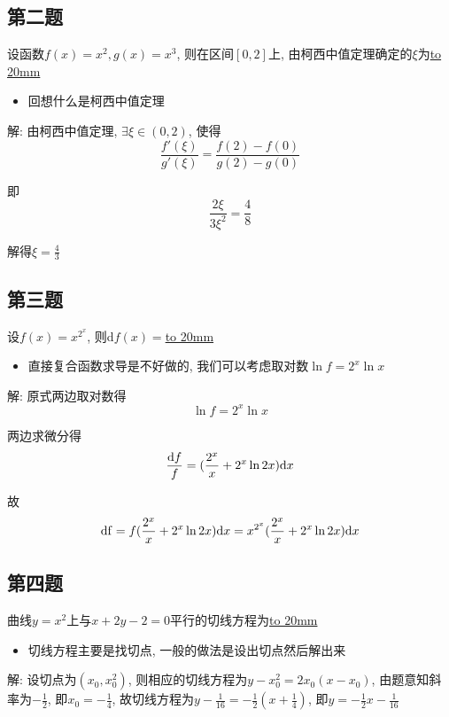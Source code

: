 \documentclass[10pt]{SelfArx} %
\numberwithin{dummy}{section}
\newenvironment{corollary}{\begin{cBox}\noindent{\bf\color{color1} 分析}}{\end{cBox}}
\begin{document}
\subsection{第二题}
设函数$f(x)=x^2, g(x)=x^3$, 则在区间$[0,2]$上, 由柯西中值定理确定的$\xi$为\underline{\hbox to 20mm{}}
\begin{corollary}
	\begin{itemize}
		\item 回想什么是柯西中值定理
	\end{itemize}
\end{corollary}
解: 由柯西中值定理, $\exists\xi\in(0,2)$, 使得
\begin{displaymath}
	\displaystyle\frac{f'(\xi)}{g'(\xi)}=\displaystyle\frac{f(2)-f(0)}{g(2)-g(0)}
\end{displaymath}

即
\begin{displaymath}
	\displaystyle\frac{2\xi}{3\xi^2}=\displaystyle\frac{4}{8}
\end{displaymath}

解得$\xi=\displaystyle\frac{4}{3}$

\subsection{第三题}
设$f(x)=x^{2^x}$, 则d$f(x)=$\underline{\hbox to 20mm{}}
\begin{corollary}
	\begin{itemize}
		\item 直接复合函数求导是不好做的, 我们可以考虑取对数\qquad$\ln f=2^x\ln x$
	\end{itemize}
\end{corollary}
解: 原式两边取对数得
\begin{displaymath}
	\ln f=2^x\ln x
\end{displaymath}

两边求微分得
\begin{displaymath}
	\displaystyle\frac{{\rm d}f}{f}=(\displaystyle\frac{2^x}{x}+2^x\ln 2x){\rm d}x
\end{displaymath}

故
\begin{displaymath}
	{\rm df}=f(\displaystyle\frac{2^x}{x}+2^x\ln 2x){\rm d}x=x^{2^x}(\displaystyle\frac{2^x}{x}+2^x\ln 2x){\rm d}x
\end{displaymath}
\subsection{第四题}
曲线$y=x^2$上与$x+2y-2=0$平行的切线方程为\underline{\hbox to 20mm{}}
\begin{corollary}
	\begin{itemize}
		\item 切线方程主要是找切点, 一般的做法是设出切点然后解出来
	\end{itemize}
\end{corollary}
解: 设切点为$(x_0,x_0^2)$, 则相应的切线方程为$y-x_0^2=2x_0(x-x_0)$, 由题意知斜率为$-\displaystyle\frac{1}{2}$, 即$x_0=-\displaystyle\frac{1}{4}$, 故切线方程为$y-\displaystyle\frac{1}{16}=-\displaystyle\frac{1}{2}(x+\displaystyle\frac{1}{4})$, 即$y=-\displaystyle\frac{1}{2}x-\displaystyle\frac{1}{16}$
\end{document}
